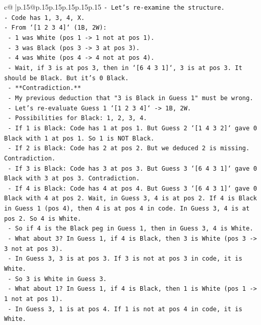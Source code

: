 \documentclass{article}
\begin{document}
{\begin{supertabular}{c@{$\;$}|p{.15\linewidth}@{}p{.15\linewidth}p{.15\linewidth}p{.15\linewidth}p{.15\linewidth}p{.15\linewidth}}
{{{\texttt{{-} Let's re{-}examine the structure.} \\
\texttt{{-} Code has 1, 3, 4, X.} \\
\texttt{{-} From `{[}1 2 3 4{]}` (1B, 2W):} \\
\texttt{  {-} 1 was White (pos 1 {-}> 1 not at pos 1).} \\
\texttt{  {-} 3 was Black (pos 3 {-}> 3 at pos 3).} \\
\texttt{  {-} 4 was White (pos 4 {-}> 4 not at pos 4).} \\
\texttt{  {-} Wait, if 3 is at pos 3, then in `{[}6 4 3 1{]}`, 3 is at pos 3. It should be Black. But it's 0 Black.} \\
\texttt{  {-} **Contradiction.**} \\
\texttt{  {-} My previous deduction that "3 is Black in Guess 1" must be wrong.} \\
\texttt{  {-} Let's re{-}evaluate Guess 1 `{[}1 2 3 4{]}` {-}> 1B, 2W.} \\
\texttt{    {-} Possibilities for Black: 1, 2, 3, 4.} \\
\texttt{    {-} If 1 is Black: Code has 1 at pos 1. But Guess 2 `{[}1 4 3 2{]}` gave 0 Black with 1 at pos 1. So 1 is NOT Black.} \\
\texttt{    {-} If 2 is Black: Code has 2 at pos 2. But we deduced 2 is missing. Contradiction.} \\
\texttt{    {-} If 3 is Black: Code has 3 at pos 3. But Guess 3 `{[}6 4 3 1{]}` gave 0 Black with 3 at pos 3. Contradiction.} \\
\texttt{    {-} If 4 is Black: Code has 4 at pos 4. But Guess 3 `{[}6 4 3 1{]}` gave 0 Black with 4 at pos 2. Wait, in Guess 3, 4 is at pos 2. If 4 is Black in Guess 1 (pos 4), then 4 is at pos 4 in code. In Guess 3, 4 is at pos 2. So 4 is White.} \\
\texttt{    {-} So if 4 is the Black peg in Guess 1, then in Guess 3, 4 is White.} \\
\texttt{    {-} What about 3? In Guess 1, if 4 is Black, then 3 is White (pos 3 {-}> 3 not at pos 3).} \\
\texttt{    {-} In Guess 3, 3 is at pos 3. If 3 is not at pos 3 in code, it is White.} \\
\texttt{    {-} So 3 is White in Guess 3.} \\
\texttt{    {-} What about 1? In Guess 1, if 4 is Black, then 1 is White (pos 1 {-}> 1 not at pos 1).} \\
\texttt{    {-} In Guess 3, 1 is at pos 4. If 1 is not at pos 4 in code, it is White.} \\
}}}
\end{supertabular}}
\end{document}
